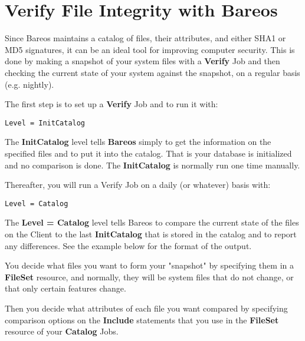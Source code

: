 
\chapter{Verify File Integrity with Bareos}
\label{VerifyChapter}

Since Bareos maintains a catalog of files, their attributes, and either SHA1
or MD5 signatures, it can be an ideal tool for improving computer security.
This is done by making a snapshot of your system files with a {\bf Verify} Job
and then checking the current state of your system against the snapshot, on a
regular basis (e.g. nightly).

The first step is to set up a {\bf Verify} Job and to run it with:

\footnotesize
\begin{verbatim}
Level = InitCatalog
\end{verbatim}
\normalsize

The {\bf InitCatalog} level tells {\bf Bareos} simply to get the information on
the specified files and to put it into the catalog. That is your database is
initialized and no comparison is done. The {\bf InitCatalog} is normally run
one time manually.

Thereafter, you will run a Verify Job on a daily (or whatever) basis with:

\footnotesize
\begin{verbatim}
Level = Catalog
\end{verbatim}
\normalsize

The {\bf Level = Catalog} level tells Bareos to compare the current state of
the files on the Client to the last {\bf InitCatalog} that is stored in the
catalog and to report any differences. See the example below for the format of
the output.

You decide what files you want to form your "snapshot" by specifying them in
a {\bf FileSet} resource, and normally, they will be system files that do not
change, or that only certain features change.

Then you decide what attributes of each file you want compared by specifying
comparison options on the {\bf Include} statements that you use in the {\bf
FileSet} resource of your {\bf Catalog} Jobs.


